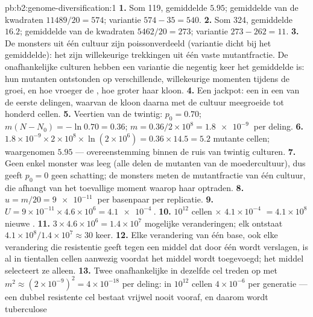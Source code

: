 \begin{solution}{pb:b2:genome-diversification:1}
\textbf{1.} Som 119, gemiddelde $5.95$; gemiddelde van de kwadraten
$11489/20 = 574$; variantie $574 - 35 = 540$.
\textbf{2.} Som 324, gemiddelde $16.2$; gemiddelde van de kwadraten
$5462/20 = 273$; variantie $273 - 262 = 11$.
\textbf{3.} De monsters uit één cultuur zijn poissonverdeeld (variantie
dicht bij het gemiddelde): het zijn willekeurige trekkingen uit één vaste
mutantfractie. De onafhankelijke culturen hebben een variantie die negentig
keer het gemiddelde is: hun mutanten ontstonden op verschillende,
willekeurige momenten tijdens de groei, en hoe vroeger de , hoe
groter haar kloon.
\textbf{4.} Een jackpot: een  in een van de eerste delingen,
waarvan de kloon daarna met de cultuur meegroeide tot honderd cellen.
\textbf{5.} Veertien van de twintig: $p_0 = 0.70$; $m(N - N_0) = -\ln 0.70
= 0.36$; $m = 0.36/2\times 10^{8} = \qty{1.8e-9}{}$ per deling.
\textbf{6.} $1.8\times 10^{-9}\times 2\times 10^{8}\times \ln(2\times
10^{6}) = 0.36\times 14.5 = 5.2$ mutante cellen; waargenomen $5.95$ ---
overeenstemming binnen de ruis van twintig culturen.
\textbf{7.} Geen enkel monster was leeg (alle delen de mutanten van de
moedercultuur), dus geeft $p_0 = 0$ geen schatting; de monsters meten de
mutantfractie van één cultuur, die afhangt van het toevallige moment
waarop haar  optraden.
\textbf{8.} $u = m/20 = \qty{9e-11}{}$ per basenpaar per replicatie.
\textbf{9.} $U = 9\times 10^{-11}\times 4.6\times 10^{6} =
\qty{4.1e-4}{}$.
\textbf{10.} $10^{12}$ cellen $\times$ $4.1\times 10^{-4}$ $= 4.1\times
10^{8}$ nieuwe .
\textbf{11.} $3\times 4.6\times 10^{6} = 1.4\times 10^{7}$ mogelijke
veranderingen; elk ontstaat $4.1\times 10^{8}/1.4\times 10^{7} \approx 30$
keer.
\textbf{12.} Elke verandering van één base, ook elke verandering die
resistentie geeft tegen een middel dat door één  wordt verslagen,
is al in tientallen cellen aanwezig voordat het middel wordt toegevoegd;
het middel selecteert ze alleen.
\textbf{13.} Twee onafhankelijke  in dezelfde cel treden op met
$m^2 \approx (2\times 10^{-9})^2 = 4\times 10^{-18}$ per deling: in
$10^{12}$ cellen $4\times 10^{-6}$ per generatie --- een dubbel
resistente cel bestaat vrijwel nooit vooraf, en daarom wordt tuberculose

\end{solution}
